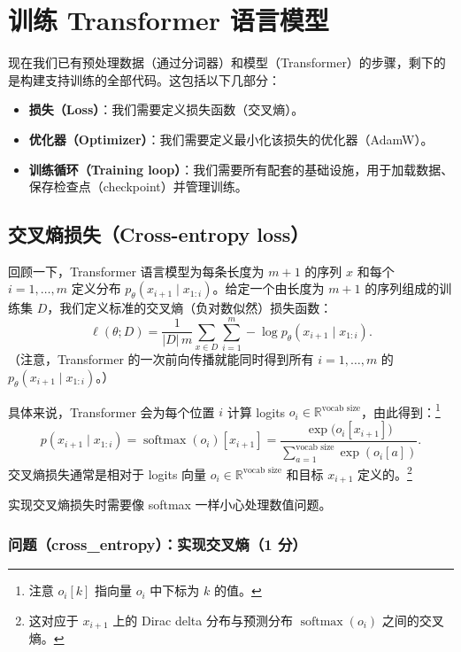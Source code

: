 \section{训练 Transformer 语言模型}

现在我们已有预处理数据（通过分词器）和模型（Transformer）的步骤，剩下的是构建支持训练的全部代码。这包括以下几部分：
\begin{itemize}
  \item \textbf{损失（Loss）}：我们需要定义损失函数（交叉熵）。
  \item \textbf{优化器（Optimizer）}：我们需要定义最小化该损失的优化器（AdamW）。
  \item \textbf{训练循环（Training loop）}：我们需要所有配套的基础设施，用于加载数据、保存检查点（checkpoint）并管理训练。
\end{itemize}

\subsection{交叉熵损失（Cross-entropy loss）}

回顾一下，Transformer 语言模型为每条长度为 $m + 1$ 的序列 $x$ 和每个 $i = 1, \ldots, m$ 定义分布 $p_\theta(x_{i+1} \mid x_{1:i})$。给定一个由长度为 $m + 1$ 的序列组成的训练集 $D$，我们定义标准的交叉熵（负对数似然）损失函数：
\begin{equation}
\ell(\theta; D) = \frac{1}{|D|\, m} \sum_{x \in D} \sum_{i=1}^{m} -\log p_\theta(x_{i+1} \mid x_{1:i}).
\tag{16}
\end{equation}
（注意，Transformer 的一次前向传播就能同时得到所有 $i = 1, \ldots, m$ 的 $p_\theta(x_{i+1} \mid x_{1:i})$。）

具体来说，Transformer 会为每个位置 $i$ 计算 logits $o_i \in \mathbb{R}^{\text{vocab size}}$，由此得到：\footnote{注意 $o_i[k]$ 指向量 $o_i$ 中下标为 $k$ 的值。}
\begin{equation}
p(x_{i+1} \mid x_{1:i}) = \operatorname{softmax}(o_i)[x_{i+1}] = \frac{\exp\bigl(o_i[x_{i+1}]\bigr)}{\sum_{a=1}^{\text{vocab size}} \exp(o_i[a])}.
\tag{17}
\end{equation}
交叉熵损失通常是相对于 logits 向量 $o_i \in \mathbb{R}^{\text{vocab size}}$ 和目标 $x_{i+1}$ 定义的。\footnote{这对应于 $x_{i+1}$ 上的 Dirac delta 分布与预测分布 $\operatorname{softmax}(o_i)$ 之间的交叉熵。}

实现交叉熵损失时需要像 softmax 一样小心处理数值问题。

\subsubsection*{问题（cross\_entropy）：实现交叉熵（1 分）}

